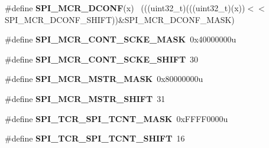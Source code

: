 \begin{DoxyCompactItemize}
\item 
\hypertarget{group___s_p_i___register___masks_gaa402d5f6da9c9ba06834c77dba6eb9d9}{}\#define {\bfseries S\+P\+I\+\_\+\+M\+C\+R\+\_\+\+D\+C\+O\+N\+F}(x)                                              ~(((uint32\+\_\+t)(((uint32\+\_\+t)(x))$<$$<$S\+P\+I\+\_\+\+M\+C\+R\+\_\+\+D\+C\+O\+N\+F\+\_\+\+S\+H\+I\+F\+T))\&S\+P\+I\+\_\+\+M\+C\+R\+\_\+\+D\+C\+O\+N\+F\+\_\+\+M\+A\+S\+K)\label{group___s_p_i___register___masks_gaa402d5f6da9c9ba06834c77dba6eb9d9}

\item 
\hypertarget{group___s_p_i___register___masks_gad40a2cace787fe5eaaf74379ffb7cfc2}{}\#define {\bfseries S\+P\+I\+\_\+\+M\+C\+R\+\_\+\+C\+O\+N\+T\+\_\+\+S\+C\+K\+E\+\_\+\+M\+A\+S\+K}~0x40000000u\label{group___s_p_i___register___masks_gad40a2cace787fe5eaaf74379ffb7cfc2}

\item 
\hypertarget{group___s_p_i___register___masks_ga57c862186e43a26823716267bfadd92f}{}\#define {\bfseries S\+P\+I\+\_\+\+M\+C\+R\+\_\+\+C\+O\+N\+T\+\_\+\+S\+C\+K\+E\+\_\+\+S\+H\+I\+F\+T}~30\label{group___s_p_i___register___masks_ga57c862186e43a26823716267bfadd92f}

\item 
\hypertarget{group___s_p_i___register___masks_gaa201344af736c83618497329b6529f04}{}\#define {\bfseries S\+P\+I\+\_\+\+M\+C\+R\+\_\+\+M\+S\+T\+R\+\_\+\+M\+A\+S\+K}~0x80000000u\label{group___s_p_i___register___masks_gaa201344af736c83618497329b6529f04}

\item 
\hypertarget{group___s_p_i___register___masks_ga7118ec0360c840ddef7e666831cb13fb}{}\#define {\bfseries S\+P\+I\+\_\+\+M\+C\+R\+\_\+\+M\+S\+T\+R\+\_\+\+S\+H\+I\+F\+T}~31\label{group___s_p_i___register___masks_ga7118ec0360c840ddef7e666831cb13fb}

\item 
\hypertarget{group___s_p_i___register___masks_ga3b9bdb39b00af35d3f731123bc82d143}{}\#define {\bfseries S\+P\+I\+\_\+\+T\+C\+R\+\_\+\+S\+P\+I\+\_\+\+T\+C\+N\+T\+\_\+\+M\+A\+S\+K}~0x\+F\+F\+F\+F0000u\label{group___s_p_i___register___masks_ga3b9bdb39b00af35d3f731123bc82d143}

\item 
\hypertarget{group___s_p_i___register___masks_ga4ac4f90bab2c1a761f439f50bcdca71f}{}\#define {\bfseries S\+P\+I\+\_\+\+T\+C\+R\+\_\+\+S\+P\+I\+\_\+\+T\+C\+N\+T\+\_\+\+S\+H\+I\+F\+T}~16\label{group___s_p_i___register___masks_ga4ac4f90bab2c1a761f439f50bcdca71f}


\end{DoxyCompactItemize}

